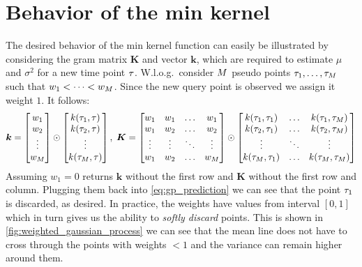 \section{Behavior of the min kernel}\label{gp_min_kernel}

The desired behavior of the min kernel function can easily be illustrated by considering the gram matrix $\bm{K}$  and vector  $\bm{k}$, which are required to estimate $\mu$ and $\sigma^2$ for a new time point $\tau$.
W.l.o.g.\ consider $M$ pseudo points $\tau_1, \dots, \tau_M$ such that $w_1 < \dots < w_M$. Since the new query point is observed we assign it weight $1$. It follows:
\begin{equation}\label{eq:min-kernel-example}
\bm{k} = \begin{bmatrix}
   w_1 \\
   w_2 \\
   \vdots \\
   w_M
\end{bmatrix}
\odot
\begin{bmatrix}
   k(\tau_1, \tau) \\
   k(\tau_2, \tau) \\
   \vdots \\
   k(\tau_M, \tau) \\
\end{bmatrix},
\;
\bm{K} =
\begin{bmatrix}
   w_1 & w_1 & \dots & w_1 \\
   w_1 & w_2 & \dots & w_2 \\
   \vdots & \vdots & \ddots & \vdots \\
   w_1 & w_2 & \dots & w_M
\end{bmatrix}
\odot
\begin{bmatrix}
   k(\tau_1, \tau_1) & \dots & k(\tau_1, \tau_M) \\
   k(\tau_2, \tau_1) & \dots & k(\tau_2, \tau_M) \\
   \vdots & \ddots & \vdots \\
   k(\tau_M, \tau_1) & \dots & k(\tau_M, \tau_M)
\end{bmatrix}
\end{equation}
Assuming $w_1=0$ returns $\bm{k}$ without the first row and $\bm{K}$ without the first row and column. Plugging them back into \cref{eq:gp_prediction} we can see that the point $\tau_1$ is discarded, as desired.
In practice, the weights have values from interval $[0, 1]$ which in turn gives us the ability to \textit{softly discard} points. This is shown in \cref{fig:weighted_gaussian_process} we can see that the mean line does not have to cross through the points with weights $<1$ and the variance can remain higher around them.
